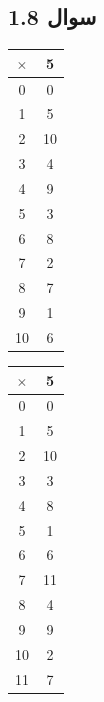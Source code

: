 \documentclass{article}
\begin{document}
\subsection{سوال 1.8}
\begin{latin}
\begin{table}[H]
\centering
\begin{tabular}{|c|c|}
\hline
$\times$ & 5  \\ \hline
0        & 0  \\ \hline
1        & 5  \\ \hline
2        & 10 \\ \hline
3        & 4  \\ \hline
4        & 9  \\ \hline
5        & 3  \\ \hline
6        & 8  \\ \hline
7        & 2  \\ \hline
8        & 7  \\ \hline
9        & 1  \\ \hline
10       & 6  \\ \hline
\end{tabular}
\end{table}

\begin{table}[H]
\centering
\begin{tabular}{|c|c|}
\hline
$\times$ & 5  \\ \hline
0        & 0  \\ \hline
1        & 5  \\ \hline
2        & 10 \\ \hline
3        & 3  \\ \hline
4        & 8  \\ \hline
5        & 1  \\ \hline
6        & 6  \\ \hline
7        & 11 \\ \hline
8        & 4  \\ \hline
9        & 9  \\ \hline
10       & 2  \\ \hline
11       & 7  \\ \hline
\end{tabular}
\end{table}


\end{latin}
\end{document}
